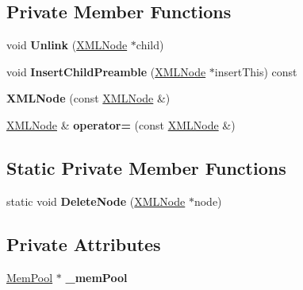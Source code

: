 \subsection*{Private Member Functions}
\begin{DoxyCompactItemize}
\item 
\hypertarget{classtinyxml2_1_1_x_m_l_node_a9546e242b6a4f232415befb1cfe0fdd4}{}void {\bfseries Unlink} (\hyperlink{classtinyxml2_1_1_x_m_l_node}{X\+M\+L\+Node} $\ast$child)\label{classtinyxml2_1_1_x_m_l_node_a9546e242b6a4f232415befb1cfe0fdd4}

\item 
\hypertarget{classtinyxml2_1_1_x_m_l_node_a7d048822eae74efbfc5d50ff023aef88}{}void {\bfseries Insert\+Child\+Preamble} (\hyperlink{classtinyxml2_1_1_x_m_l_node}{X\+M\+L\+Node} $\ast$insert\+This) const \label{classtinyxml2_1_1_x_m_l_node_a7d048822eae74efbfc5d50ff023aef88}

\item 
\hypertarget{classtinyxml2_1_1_x_m_l_node_a78be01384518a969da905548f318d75b}{}{\bfseries X\+M\+L\+Node} (const \hyperlink{classtinyxml2_1_1_x_m_l_node}{X\+M\+L\+Node} \&)\label{classtinyxml2_1_1_x_m_l_node_a78be01384518a969da905548f318d75b}

\item 
\hypertarget{classtinyxml2_1_1_x_m_l_node_ade79231d908e1f21862819e00e56ab6e}{}\hyperlink{classtinyxml2_1_1_x_m_l_node}{X\+M\+L\+Node} \& {\bfseries operator=} (const \hyperlink{classtinyxml2_1_1_x_m_l_node}{X\+M\+L\+Node} \&)\label{classtinyxml2_1_1_x_m_l_node_ade79231d908e1f21862819e00e56ab6e}

\end{DoxyCompactItemize}
\subsection*{Static Private Member Functions}
\begin{DoxyCompactItemize}
\item 
\hypertarget{classtinyxml2_1_1_x_m_l_node_af86facb14f441c2b91f3518f106dc943}{}static void {\bfseries Delete\+Node} (\hyperlink{classtinyxml2_1_1_x_m_l_node}{X\+M\+L\+Node} $\ast$node)\label{classtinyxml2_1_1_x_m_l_node_af86facb14f441c2b91f3518f106dc943}

\end{DoxyCompactItemize}
\subsection*{Private Attributes}
\begin{DoxyCompactItemize}
\item 
\hypertarget{classtinyxml2_1_1_x_m_l_node_a4e3ff179bc312480b6bc3e57014834f7}{}\hyperlink{classtinyxml2_1_1_mem_pool}{Mem\+Pool} $\ast$ {\bfseries \+\_\+mem\+Pool}\label{classtinyxml2_1_1_x_m_l_node_a4e3ff179bc312480b6bc3e57014834f7}

\end{DoxyCompactItemize}
